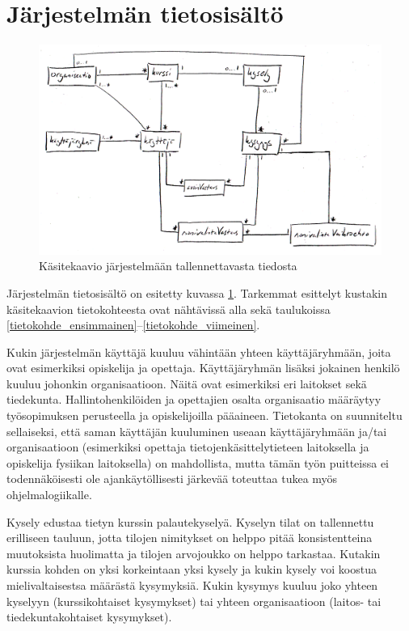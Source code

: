 \documentclass[12pt,a4paper,titlepage]{article}
\begin{document}
\section{Järjestelmän tietosisältö}
\begin{figure}
   \centering
   \includegraphics[width=\textwidth]{kuvat/kasitekaavio.png}
   \caption{Käsitekaavio järjestelmään tallennettavasta tiedosta}\label{fig:kasitekaavio}
\end{figure}

Järjestelmän tietosisältö on esitetty kuvassa \ref{fig:kasitekaavio}. Tarkemmat esittelyt kustakin käsitekaavion tietokohteesta ovat nähtävissä alla sekä taulukoissa \ref{tietokohde_ensimmainen}--\ref{tietokohde_viimeinen}.

Kukin järjestelmän käyttäjä kuuluu vähintään yhteen käyttäjäryhmään, joita ovat esimerkiksi opiskelija ja opettaja. Käyttäjäryhmän lisäksi jokainen henkilö kuuluu johonkin organisaatioon. Näitä ovat esimerkiksi eri laitokset sekä tiedekunta. Hallintohenkilöiden ja opettajien osalta organisaatio määräytyy työsopimuksen perusteella ja opiskelijoilla pääaineen. Tietokanta on suunniteltu sellaiseksi, että saman käyttäjän kuuluminen useaan käyttäjäryhmään ja/tai organisaatioon (esimerkiksi opettaja tietojenkäsittelytieteen laitoksella ja opiskelija fysiikan laitoksella) on mahdollista, mutta tämän työn puitteissa ei todennäköisesti ole ajankäytöllisesti järkevää toteuttaa tukea myös ohjelmalogiikalle.

Kysely edustaa tietyn kurssin palautekyselyä. Kyselyn tilat on tallennettu erilliseen tauluun, jotta tilojen nimitykset on helppo pitää konsistentteina muutoksista huolimatta ja tilojen arvojoukko on helppo tarkastaa. Kutakin kurssia kohden on yksi korkeintaan yksi kysely ja kukin kysely voi koostua mielivaltaisestsa määrästä kysymyksiä. Kukin kysymys kuuluu joko yhteen kyselyyn (kurssikohtaiset kysymykset) tai yhteen organisaatioon (laitos- tai tiedekuntakohtaiset kysymykset).
\end{document}
